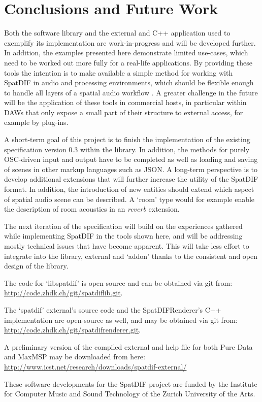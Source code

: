 \documentclass{article}
\begin{document}
\section{Conclusions and Future Work}\label{sec:conclusions_future_work}

Both the software library and the external and C++ application used to exemplify its implementation are work-in-progress and will be developed further.
In addition, the examples presented here demonstrate limited use-cases, which need to be worked out more fully for a real-life applications.
By providing these tools the intention is to make available a simple method for working with SpatDIF in audio and processing environments, which should be flexible enough to handle all layers of a spatial audio workflow \cite{PetersSMC09}.
A greater challenge in the future will be the application of these tools in commercial hosts, in particular within DAWs that only expose a small part of their structure to external access, for example by plug-ins.

A short-term goal of this project is to finish the implementation of the existing specification version 0.3 \cite{SpatDIF_03} within the library.
In addition, the methods for purely OSC-driven input and output have to be completed as well as loading and saving of scenes in other markup languages such as JSON.
A long-term perspective is to develop additional extensions that will further increase the utility of the SpatDIF format.
In addition, the introduction of new entities should extend which aspect of spatial audio scene can be described. 
A `room' type would for example enable the description of room acoustics in an \emph{reverb} extension.

The next iteration of the specification will build on the experiences gathered while implementing SpatDIF in the tools shown here, and will be addressing mostly technical issues that have become apparent.
This will take less effort to integrate into the library, external and `addon' thanks to the consistent and open design of the library.

The code for `libspatdif' is open-source and can be obtained via git from: \url{http://code.zhdk.ch/git/spatdiflib.git}.
 
The `spatdif' external's source code and the SpatDIFRenderer's C++ implementation are open-source as well, and may be obtained via git from: \url{http://code.zhdk.ch/git/spatdifrenderer.git}.

A preliminary version of the compiled external and help file for both Pure Data and MaxMSP may be downloaded from here: \url{http://www.icst.net/research/downloads/spatdif-external/}

\break

\begin{acknowledgments}
These software developments for the SpatDIF project are funded by the Institute for Computer Music and Sound Technology of the Zurich University of the Arts.
\end{acknowledgments} 



\printbibliography
\end{document}
